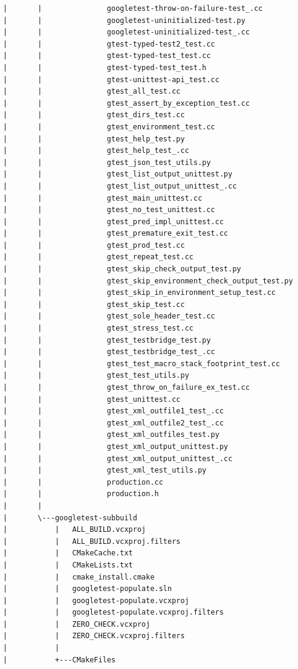 \documentclass[12pt,a4paper]{article}
\begin{document}
\begin{verbatim}
|       |               googletest-throw-on-failure-test_.cc
|       |               googletest-uninitialized-test.py
|       |               googletest-uninitialized-test_.cc
|       |               gtest-typed-test2_test.cc
|       |               gtest-typed-test_test.cc
|       |               gtest-typed-test_test.h
|       |               gtest-unittest-api_test.cc
|       |               gtest_all_test.cc
|       |               gtest_assert_by_exception_test.cc
|       |               gtest_dirs_test.cc
|       |               gtest_environment_test.cc
|       |               gtest_help_test.py
|       |               gtest_help_test_.cc
|       |               gtest_json_test_utils.py
|       |               gtest_list_output_unittest.py
|       |               gtest_list_output_unittest_.cc
|       |               gtest_main_unittest.cc
|       |               gtest_no_test_unittest.cc
|       |               gtest_pred_impl_unittest.cc
|       |               gtest_premature_exit_test.cc
|       |               gtest_prod_test.cc
|       |               gtest_repeat_test.cc
|       |               gtest_skip_check_output_test.py
|       |               gtest_skip_environment_check_output_test.py
|       |               gtest_skip_in_environment_setup_test.cc
|       |               gtest_skip_test.cc
|       |               gtest_sole_header_test.cc
|       |               gtest_stress_test.cc
|       |               gtest_testbridge_test.py
|       |               gtest_testbridge_test_.cc
|       |               gtest_test_macro_stack_footprint_test.cc
|       |               gtest_test_utils.py
|       |               gtest_throw_on_failure_ex_test.cc
|       |               gtest_unittest.cc
|       |               gtest_xml_outfile1_test_.cc
|       |               gtest_xml_outfile2_test_.cc
|       |               gtest_xml_outfiles_test.py
|       |               gtest_xml_output_unittest.py
|       |               gtest_xml_output_unittest_.cc
|       |               gtest_xml_test_utils.py
|       |               production.cc
|       |               production.h
|       |               
|       \---googletest-subbuild
|           |   ALL_BUILD.vcxproj
|           |   ALL_BUILD.vcxproj.filters
|           |   CMakeCache.txt
|           |   CMakeLists.txt
|           |   cmake_install.cmake
|           |   googletest-populate.sln
|           |   googletest-populate.vcxproj
|           |   googletest-populate.vcxproj.filters
|           |   ZERO_CHECK.vcxproj
|           |   ZERO_CHECK.vcxproj.filters
|           |   
|           +---CMakeFiles

\end{verbatim}
\end{document}
